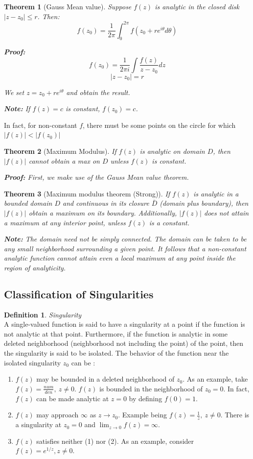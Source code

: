 \documentclass{article}
\newtheorem{theorem}{Theorem}[section]
\theoremstyle{definition}
\newtheorem{definition}{Definition}[section]
\newcommand{\Def}[2]{
\begin{shaded*}
\begin{definition}{\textit{#1}}\\#2\end{definition}
\end{shaded*}
}
\begin{document}
\begin{theorem}[Gauss Mean value]
Suppose $f(z)$ is analytic in the closed disk $|z-z_0| \leq r$. Then:
$$f(z_0) = \frac{1}{2 \pi } \int_{0}^{2\pi} f(z_0 + r e^{i\theta} d\theta)$$

\textbf{Proof:}
$$f(z_0) = \frac{1}{2 \pi i } \int \frac{f(z)}{z-z_0} dz$$
$$|z-z_0| = r$$

We set $z = z_0 + r e^{i\theta}$ and obtain the result. 

\textbf{Note:} If $f(z) = c$ is constant, $f(z_0)=c$. 
\end{theorem}
In fact, for non-constant $f$, there must be some points on the circle for which $|f(z)| < |f(z_0)|$

\begin{theorem}[Maximum Modulus]
If $f(z)$ is analytic on domain $D$, then $|f(z)|$ cannot obtain a max on $D$ unless $f(z)$ is constant. 

\textbf{Proof:}
First, we make use of the Gauss Mean value theorem. 
\end{theorem}

\begin{theorem}[Maximum modulus theorem (Strong)]
If $f(z)$ is analytic in a bounded domain $D$ and continuous in its closure $\bar{D}$ (domain plus boundary), then $|f(z)|$ obtain a maximum on its boundary. Additionally, $|f(z)|$ does not attain a maximum at any interior point, unless $f(z) $ is a constant.

\textbf{Note:} The domain need not be simply connected. The domain can be taken to be any small neighborhood surrounding a given point. It follows that a non-constant analytic function cannot attain even a local maximum at any point inside the region of analyticity.
\end{theorem}

\subsection{Classification of Singularities}
\Def{Singularity}{A single-valued function is said to have a singularity at a point if the function is not analytic at that point. Furthermore, if the function is analytic in some deleted neighborhood (neighborhood not including the point) of the point, then the singularity is said to be isolated. The behavior of the function near the isolated singularity $z_0$ can be :

\begin{enumerate}
	\item $f(z)$ may be bounded in a deleted neighborhood of $z_0$. As an example, take $f(z) = \frac{num}{den},\ z\neq 0$. $f(z)$ is bounded in the neighborhood of $z_0 = 0$. In fact, $f(z)$ can be made analytic at $z=0$ by defining $f(0)=1$. 
	\item $f(z)$ may approach $\infty$ as $z \to z_0$. Example being $f(z) = \frac{1}{z},\ z \neq 0$. There is a singularity at $z_0 = 0$ and $\lim_{z\to0} f(z) = \infty $. 
	\item $f(z)$ satisfies neither (1) nor (2). As an example, consider $f(z) = e^{1/z}, z\neq 0$. 
\end{enumerate}
}
\end{document}
